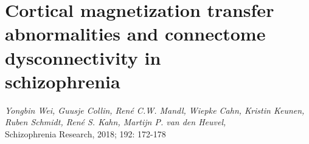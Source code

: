 \chapter[MTR abnormalities and dysconnectivity in schizophrenia]{Cortical magnetization transfer abnormalities and connectome dysconnectivity in\\ schizophrenia}
\label{ch:mtrscz}

\begin{flushright}
\textit{Yongbin Wei, Guusje Collin, René C.W. Mandl, Wiepke Cahn, Kristin Keunen, \\Ruben Schmidt, René S. Kahn, Martijn P. van den Heuvel,
}\\
Schizophrenia Research, 2018; 192: 172-178
\vspace{7 mm}

\end{flushright}

